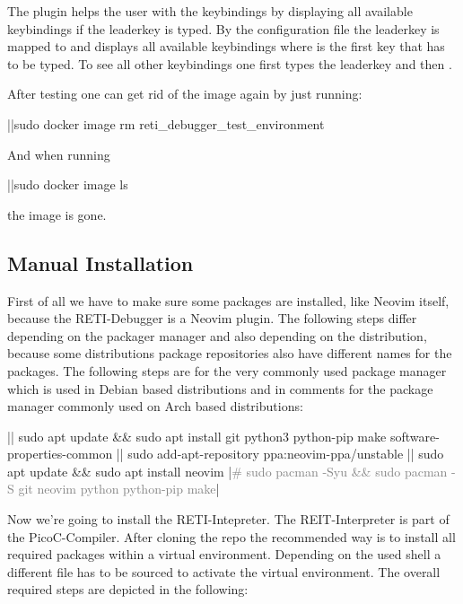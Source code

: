 \documentclass{report}
\begin{document}
The  plugin helps the user with the keybindings by displaying all available keybindings if the \alert{leaderkey} is typed. By the configuration file  the leaderkey is mapped to  and displays all available keybindings where  is the first key that has to be typed. To see all other keybindings one first types the leaderkey  and then \inlinebox{$\leftarrow$}.

After testing one can get rid of the image again by just running:

\begin{terminal}
	|\prompt|sudo docker image rm reti_debugger_test_environment
\end{terminal}

And when running

\begin{terminal}
	|\prompt|sudo docker image ls
\end{terminal}

the image is gone.

\subsection{Manual Installation}
\label{sec:manual installation}

First of all we have to make sure some packages are installed, like Neovim itself, because the RETI-Debugger is a Neovim plugin. The following steps differ depending on the packager manager and also depending on the distribution, because some distributions package repositories also have different names for the packages. The following steps are for the very commonly used package manager  which is used in Debian based distributions and in comments for the  package manager commonly used on Arch based distributions:

\begin{terminal}
  |\prompt| sudo apt update && sudo apt install git python3 python-pip make 
     software-properties-common
  |\prompt| sudo add-apt-repository ppa:neovim-ppa/unstable
  |\prompt| sudo apt update && sudo apt install neovim
  |\textcolor{gray}{# sudo pacman -Syu && sudo pacman -S git neovim python python-pip make}|
\end{terminal}

Now we're going to install the RETI-Intepreter. The REIT-Interpreter is part of the PicoC-Compiler. After cloning the repo the recommended way is to install all required packages within a \alert{virtual environment}. Depending on the used \alert{shell} a different file has to be sourced to activate the virtual environment. The overall required steps are depicted in the following:
\end{document}
